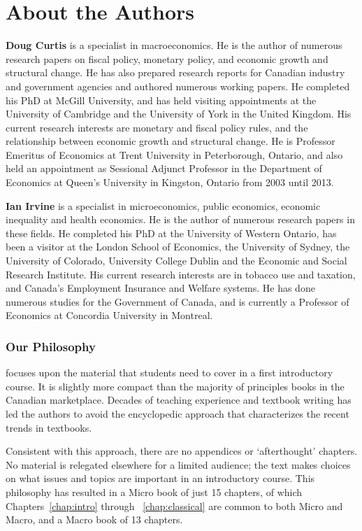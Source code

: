 \chapter*{About the Authors}

\textbf{Doug Curtis} is a specialist in macroeconomics. He is the author of numerous research papers on fiscal policy, monetary policy, and economic growth and structural change. He has also prepared research reports for Canadian industry and government agencies and authored numerous working papers. He completed his PhD at McGill University, and has held visiting appointments at the University of Cambridge and the University of York in the United Kingdom. His current research interests are monetary and fiscal policy rules, and the relationship between economic growth and structural change. He is Professor Emeritus of Economics at Trent University in Peterborough, Ontario, and also held an appointment as Sessional Adjunct Professor in the Department of Economics at Queen's University in Kingston, Ontario from 2003 until 2013.

\textbf{Ian Irvine} is a specialist in microeconomics, public economics, economic inequality and health economics. He is the author of numerous research papers in these fields. He completed his PhD at the University of Western Ontario, has been a visitor at the London School of Economics, the University of Sydney, the University of Colorado, University College Dublin and the Economic and Social Research Institute. His current research interests are in tobacco use and taxation, and Canada's Employment Insurance and Welfare systems. He has done numerous studies for the Government of Canada, and is currently a Professor of Economics at Concordia University in Montreal.

\subsection*{Our Philosophy}

\emph{\booktitle} focuses upon the material that students need to cover in a first introductory course. It is slightly more compact than the majority of principles books in the Canadian marketplace. Decades of teaching experience and textbook writing has led the authors to avoid the encyclopedic approach that characterizes the recent trends in textbooks.

Consistent with this approach, there are no appendices or `afterthought' chapters. No material is relegated elsewhere for a limited audience; the text makes choices on what issues and topics are important in an introductory course. This philosophy has resulted in a Micro book of just 15 chapters, of which Chapters~\ref{chap:intro} through ~\ref{chap:classical} are common to both Micro and Macro, and a Macro book of 13 chapters.

